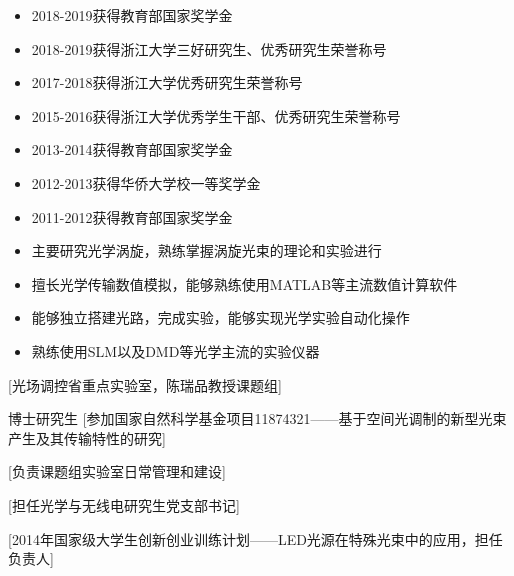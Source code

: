 \documentclass[zh]{resume}
\begin{document}
\begin{itemize}
  \item 2018-2019获得教育部国家奖学金
  \item 2018-2019获得浙江大学三好研究生、优秀研究生荣誉称号
  \item 2017-2018获得浙江大学优秀研究生荣誉称号
  \item 2015-2016获得浙江大学优秀学生干部、优秀研究生荣誉称号
  \item 2013-2014获得教育部国家奖学金
  \item 2012-2013获得华侨大学校一等奖学金
  \item 2011-2012获得教育部国家奖学金
  
\end{itemize}
\newpage
{}
\begin{itemize}
  \item 主要研究光学涡旋，熟练掌握涡旋光束的理论和实验进行
  \item 擅长光学传输数值模拟，能够熟练使用MATLAB等主流数值计算软件
  \item 能够独立搭建光路，完成实验，能够实现光学实验自动化操作
  \item 熟练使用SLM以及DMD等光学主流的实验仪器
\end{itemize}


\begin{experiences}
  [光场调控省重点实验室，陈瑞品教授课题组]
\end{experiences}
\begin{experiences}
    {博士研究生}%
    [参加国家自然科学基金项目11874321——基于空间光调制的新型光束产生及其传输特性的研究] 
\end{experiences}
\begin{experiences}
  [负责课题组实验室日常管理和建设]
\end{experiences}  
\begin{experiences}
  [担任光学与无线电研究生党支部书记]
\end{experiences}
\begin{experiences}
  [2014年国家级大学生创新创业训练计划——LED光源在特殊光束中的应用，担任负责人]
\end{experiences}
\end{document}
